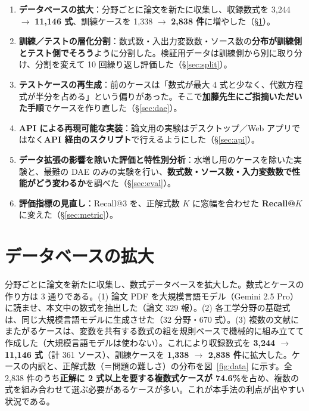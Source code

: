 \documentclass[11pt,a4paper]{ltjsarticle}
\begin{document}
\begin{enumerate}[leftmargin=1.8em]
  \item \textbf{データベースの拡大}：分野ごとに論文を新たに収集し、収録数式を 3{,}244 $\to$ \textbf{11{,}146 式}、訓練ケースを 1{,}338 $\to$ \textbf{2{,}838 件}に増やした（\S\ref{sec:db}）。
  \item \textbf{訓練／テストの層化分割}：数式数・入出力変数数・ソース数の\textbf{分布が訓練側とテスト側でそろう}ように分割した。検証用データは訓練側から別に取り分け、分割を変えて 10 回繰り返し評価した（\S\ref{sec:split}）。
  \item \textbf{テストケースの再生成}：前のケースは「数式が最大 4 式と少なく、代数方程式が半分を占める」という偏りがあった。そこで\textbf{加藤先生にご指摘いただいた手順}でケースを作り直した（\S\ref{sec:dae}）。
  \item \textbf{API による再現可能な実装}：論文用の実験はデスクトップ／Web アプリではなく\textbf{API 経由のスクリプト}で行えるようにした（\S\ref{sec:api}）。
  \item \textbf{データ拡張の影響を除いた評価と特性別分析}：水増し用のケースを除いた実験と、最難の DAE のみの実験を行い、\textbf{数式数・ソース数・入力変数数で性能がどう変わるか}を調べた（\S\ref{sec:eval}）。
  \item \textbf{評価指標の見直し}：Recall@3 を、正解式数 $K$ に窓幅を合わせた \textbf{Recall@$K$} に変えた（\S\ref{sec:metric}）。
\end{enumerate}

\section{データベースの拡大}\label{sec:db}
分野ごとに論文を新たに収集し、数式データベースを拡大した。数式とケースの作り方は 3 通りである。(1) 論文 PDF を大規模言語モデル（Gemini 2.5 Pro）に読ませ、本文中の数式を抽出した（論文 329 報）。(2) 各工学分野の基礎式は、同じ大規模言語モデルに生成させた（32 分野・670 式）。(3) 複数の文献にまたがるケースは、変数を共有する数式の組を規則ベースで機械的に組み立てて作成した（大規模言語モデルは使わない）。これにより収録数式を \textbf{3{,}244 $\to$ 11{,}146 式}（計 361 ソース）、訓練ケースを \textbf{1{,}338 $\to$ 2{,}838 件}に拡大した。ケースの内訳と、正解式数（＝問題の難しさ）の分布を図~\ref{fig:data} に示す。全 2{,}838 件のうち\textbf{正解に 2 式以上を要する複数式ケースが 74.6\%}を占め、複数の式を組み合わせて選ぶ必要があるケースが多い。これが本手法の利点が出やすい状況である。
\end{document}
